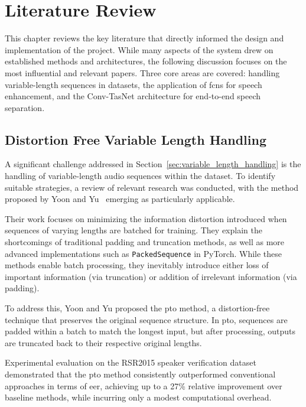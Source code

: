 \graphicspath{{content/chapters/3_literature/figures/}}
\chapter{Literature Review}
\label{sec:literature_review}

This chapter reviews the key literature that directly informed the design and implementation of the project. While many aspects of the system drew on established methods and architectures, the following discussion focuses on the most influential and relevant papers. Three core areas are covered: handling variable-length sequences in datasets, the application of \gls{fcn}s for speech enhancement, and the Conv-TasNet architecture for end-to-end speech separation.

\section{Distortion Free Variable Length Handling} 
\label{sec:distortion_free_handling}

A significant challenge addressed in Section~\ref{sec:variable_length_handling} is the handling of variable-length audio sequences within the dataset. To identify suitable strategies, a review of relevant research was conducted, with the method proposed by Yoon and Yu~\cite{yoon2020pto} emerging as particularly applicable.

Their work focuses on minimizing the information distortion introduced when sequences of varying lengths are batched for training. They explain the shortcomings of traditional padding and truncation methods, as well as more advanced implementations such as \texttt{PackedSequence} in PyTorch. While these methods enable batch processing, they inevitably introduce either loss of important information (via truncation) or addition of irrelevant information (via padding).

To address this, Yoon and Yu proposed the \gls{pto} method, a distortion-free technique that preserves the original sequence structure. In \gls{pto}, sequences are padded within a batch to match the longest input, but after processing, outputs are truncated back to their respective original lengths.

Experimental evaluation on the RSR2015 speaker verification dataset demonstrated that the \gls{pto} method consistently outperformed conventional approaches in terms of \gls{eer}, achieving up to a 27\% relative improvement over baseline methods, while incurring only a modest computational overhead.

